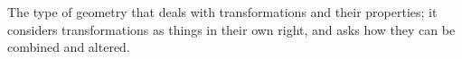 The type of geometry that deals with transformations and their properties;
it considers transformations as things in their own right, and asks
how they can be combined and altered.